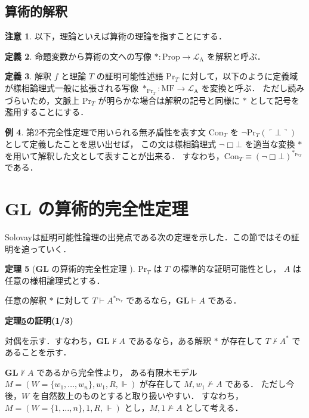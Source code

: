 \documentclass{jsarticle}
\makeatletter
\newcommand*{\Lang}[1]{\mathcal{L}_\mathrm{#1}}
\newcommand*{\LangA}{\Lang{A}}
\newcommand*{\Logic}[1]{\mathbf{#1}}
\newcommand*{\LogicGL}{\Logic{GL}}
\newcommand*{\Prop}{\mathrm{Prop}}
\newcommand*{\MF}{\mathrm{MF}}
\newcommand*{\Provable}{\mathrm{Pr}}
\theoremstyle{definition}
\newtheorem{theorem}{定理}[section]
\newtheorem{definition}[theorem]{定義}
\newtheorem{remark}[theorem]{注意}
\newtheorem{example}[theorem]{例}
\renewcommand{\proofname}{証明}
\renewenvironment{proof}[1][\proofname]{\par
    \normalfont 
    \topsep6\p@\@plus6\p@\relax
    \trivlist
    \item\relax
    {\bfseries\gtfamily
    #1\@addpunct{.}}\hspace\labelsep\ignorespaces
    }{%
    \endtrivlist
    \@endpefalse
}
\makeatother
\begin{document}
\subsection{算術的解釈}

\begin{remark}
    以下，理論といえば算術の理論を指すことにする．
\end{remark}

\begin{definition}
    命題変数から算術の文への写像 $* \colon \Prop \to \LangA$ を解釈と呼ぶ．
\end{definition}

\begin{definition}
    解釈 $f$ と理論 $T$ の証明可能性述語 $\Provable_T$ に対して，以下のように定義域が様相論理式一般に拡張される写像 $*_{\Provable_T} \colon \MF \to \LangA$ を変換と呼ぶ．
    ただし読みづらいため，文脈上 $\Provable_T$ が明らかな場合は解釈の記号と同様に $*$ として記号を濫用することにする．
\end{definition}

\begin{example}
    第2不完全性定理で用いられる無矛盾性を表す文 $\mathrm{Con}_T$ を $\lnot \Provable_T(\ulcorner \bot \urcorner)$ として定義したことを思い出せば，
    この文は様相論理式 $\lnot \Box \bot$ を適当な変換 $*$ を用いて解釈した文として表すことが出来る．
    すなわち，$\mathrm{Con}_T \equiv (\lnot \Box \bot)^{*_{\Provable_T}}$ である．
\end{example}



\section{$\LogicGL$ の算術的完全性定理}

Solovayは証明可能性論理の出発点である次の定理を示した．この節ではその証明を追っていく．

\begin{theorem}[$\LogicGL$ の算術的完全性定理 \cite*{solovay_provability_1976}]\label{thm:GL_arith_completeness}
    $\Provable_T$ は $T$ の標準的な証明可能性とし，
    $A$ は任意の様相論理式とする．

    任意の解釈 $*$ に対して $T \vdash A^{*_{\Provable_T}}$ であるなら，$\LogicGL \vdash A$ である．
\end{theorem}

\begin{proof}[定理\ref{thm:GL_arith_completeness}の証明(1/3)]
    対偶を示す．すなわち，$\LogicGL \nvdash A$ であるなら，ある解釈 $*$ が存在して $T \nvdash A^*$ であることを示す．

    $\LogicGL \nvdash A$ であるから完全性より，
    ある有限木モデル $M = (W = \{w_1, \dots, w_n\}, w_1, R, \Vdash)$ が存在して $M,w_1 \nvDash A$ である．
    ただし今後，$W$ を自然数上のものとすると取り扱いやすい．
    すなわち，$M = (W = \{1,\dots,n\}, 1, R, \Vdash)$ とし，$M,1 \nvDash A$ として考える．
\end{proof}
\end{document}
